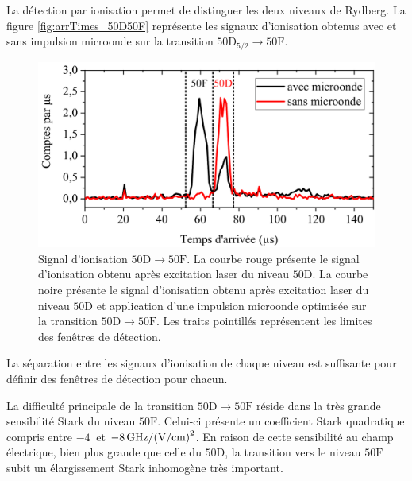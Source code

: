 La détection par ionisation permet de distinguer les deux niveaux de Rydberg.
La figure \eqref{fig:arrTimes_50D50F} représente les signaux d'ionisation obtenus avec et sans impulsion microonde sur la transition $\mathrm{50D_{5/2} \rightarrow 50F}$.
%
\begin{figure}[!h]
\centering
\includegraphics[width=0.85\linewidth]{figures/circulars/arrTimes_50D50F}
\caption[Signal d'ionisation $\mathrm{50D\rightarrow 50F}$]{
Signal d'ionisation $\mathrm{50D\rightarrow 50F}$.
La courbe rouge présente le signal d'ionisation obtenu après excitation laser du niveau $\mathrm{50D}$.
La courbe noire présente le signal d'ionisation obtenu après excitation laser du niveau $\mathrm{50D}$ et application d'une impulsion microonde optimisée sur la transition $\mathrm{50D \rightarrow 50F}$.
Les traits pointillés représentent les limites des fenêtres de détection.
}
\label{fig:arrTimes_50D50F}
\end{figure}
%
La séparation entre les signaux d'ionisation de chaque niveau est suffisante pour définir des fenêtres de détection pour chacun.

La difficulté principale de la transition $\mathrm{50D} \rightarrow\mathrm{50F}$ réside dans la très grande sensibilité Stark du niveau $\mathrm{50F}$.
Celui-ci présente un coefficient Stark quadratique compris entre $\SI{-4}{}$ et $\SI{-8}{\GHz/(\V/\cm)\squared}$.
En raison de cette sensibilité au champ électrique, bien plus grande que celle du $\mathrm{50D}$, la transition vers le niveau $\mathrm{50F}$ subit un élargissement Stark inhomogène très important.

